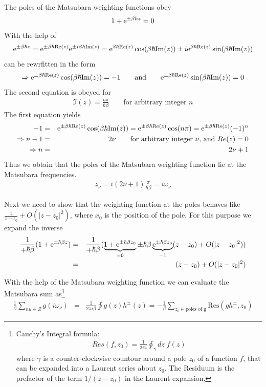 \documentclass[11pt,a4paper]{report}
\begin{document}
The poles of the Matsubara weighting functions obey
\begin{eqnarray}
1+\mathrm{e}^{\pm\beta\hbar z}=0
\label{eq:matsubarapolecond}
\end{eqnarray}
With the help of
\begin{eqnarray*}
\mathrm{e}^{\pm\beta\hbar z}
=\mathrm{e}^{\pm\beta\hbar\mathrm{Re}(z)}\mathrm{e}^{\pm i\beta\hbar\mathrm{Im}(z)}
=\mathrm{e}^{\beta\hbar\mathrm{Re}(z)}\cos(\beta\hbar\mathrm{Im}(z))
\pm i\mathrm{e}^{\beta\hbar\mathrm{Re}(z)}\sin(\beta\hbar\mathrm{Im}(z))
\end{eqnarray*}
 can be rewrfitten in the form
\begin{eqnarray}
\Rightarrow
\mathrm{e}^{\pm \beta\hbar\mathrm{Re}(z)}\cos(\beta\hbar\mathrm{Im}(z))=-1
\qquad\text{and}\qquad
\mathrm{e}^{\pm \beta\hbar\mathrm{Re}(z)}\sin(\beta\hbar\mathrm{Im}(z))=0
\end{eqnarray}
The second equation is obeyed for
\begin{eqnarray}
\Im(z)=\frac{n\pi}{\hbar\beta}\qquad\text{for arbitrary integer $n$}
\end{eqnarray}
The first equation yields
\begin{eqnarray}
-1&=&\mathrm{e}^{\pm\beta\hbar\mathrm{Re}(z)}\cos(\beta\hbar\mathrm{Im}(z))
=\mathrm{e}^{\pm\beta\hbar\mathrm{Re}(z)}\cos(n\pi)
=\mathrm{e}^{\pm\beta\hbar\mathrm{Re}(z)}(-1)^n
\nonumber\\
\Rightarrow
n-1&=&2\nu \qquad\text{for arbitrary integer $\nu$, and $Re(z)=0$}
\nonumber\\
\Rightarrow
n&=&2\nu+1
\end{eqnarray}
Thus we obtain that the poles of the Matsubara weighting function lie
at the Matsubara frequencies.
\begin{eqnarray}
z_\nu=i(2\nu+1)\frac{\pi}{\hbar\beta}=i\omega_\nu
\end{eqnarray}

Next we need to show that the weighting function at the poles behaves
like $\frac{1}{z-z_0}+O(|z-z_0|^2)$, where $x_0$ is the position of the pole.
For this purpose we expand the inverse
\begin{eqnarray}
\frac{1}{\mp\hbar\beta}(1+\mathrm{e}^{\pm\hbar\beta z})
&=&\frac{1}{\mp\hbar\beta}
(\underbrace{1+\mathrm{e}^{\pm\hbar\beta z_0}}_{=0} 
\pm\hbar\beta\underbrace{\mathrm{e}^{\pm\hbar\beta z_0}}_{-1}(z-z_0)+O(|z-z_0|^2) )
\\
&=&(z-z_0)+O(|z-z_0|^2) 
\end{eqnarray}



With the help of the Matsubara weighting function we can evaluate the
Matsubara sum as\footnote{Cauchy's Integral formula:
\begin{eqnarray*}
Res(f,z_0)=\frac{1}{2\pi i}\oint_\gamma dz\; f(z)
\end{eqnarray*}
where $\gamma$ is a counter-clockwise countour around a pole $z_0$ of
a function $f$, that can be expanded into a Laurent series about
$z_0$. The Residuum is the prefactor of the term $1/(z-z_0)$ in the
Laurent expansion.}
\begin{eqnarray}
\frac{1}{\beta}\sum_{nu\in Z}g(i\omega_\nu)&=&
\frac{1}{2\pi i\beta}\oint g(z) h^{\pm}(z)
=-\frac{1}{\beta}\sum_{z_0\in\text{poles of g}}
\text{Res}(gh^{\pm},z_0)
\end{eqnarray}
\end{document}
